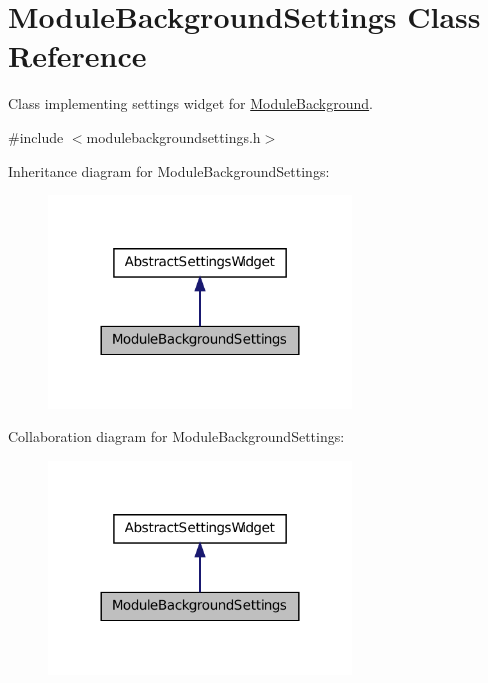 \hypertarget{class_module_background_settings}{
\section{ModuleBackgroundSettings Class Reference}
\label{d7/deb/class_module_background_settings}
}


Class implementing settings widget for \hyperlink{class_module_background}{ModuleBackground}.  




{\ttfamily \#include $<$modulebackgroundsettings.h$>$}



Inheritance diagram for ModuleBackgroundSettings:\nopagebreak
\begin{figure}[H]
\begin{center}
\leavevmode
\includegraphics[width=228pt]{d4/df9/class_module_background_settings__inherit__graph}
\end{center}
\end{figure}


Collaboration diagram for ModuleBackgroundSettings:\nopagebreak
\begin{figure}[H]
\begin{center}
\leavevmode
\includegraphics[width=228pt]{d7/d1d/class_module_background_settings__coll__graph}
\end{center}
\end{figure}
